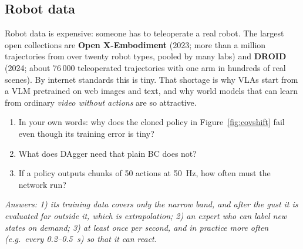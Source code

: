 \subsection{Robot data}
Robot data is expensive: someone has to teleoperate a real robot. The largest open collections are \textbf{Open X-Embodiment} (2023; more than a million trajectories from over twenty robot types, pooled by many labs) and \textbf{DROID} (2024; about 76\,000 teleoperated trajectories with one arm in hundreds of real scenes). By internet standards this is tiny. That shortage is why VLAs start from a VLM pretrained on web images and text, and why world models that can learn from ordinary \emph{video without actions} are so attractive.

\begin{quizbox}
\begin{enumerate}[leftmargin=*]
\item In your own words: why does the cloned policy in Figure~\ref{fig:covshift} fail even though its training error is tiny?
\item What does DAgger need that plain BC does not?
\item If a policy outputs chunks of 50 actions at 50~Hz, how often must the network run?
\end{enumerate}
\emph{Answers: 1) its training data covers only the narrow band, and after the gust it is evaluated far outside it, which is extrapolation; 2) an expert who can label new states on demand; 3) at least once per second, and in practice more often (e.g.\ every 0.2--0.5~s) so that it can react.}
\end{quizbox}
